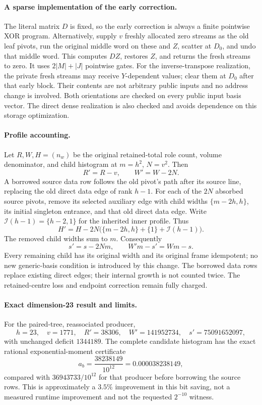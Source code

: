\paragraph{A sparse implementation of the early correction.}
The literal matrix $D$ is fixed, so the early correction is always a finite
pointwise XOR program. Alternatively, supply $v$ freshly allocated zero
streams as the old leaf pivots, run the original middle word on these and $Z$,
scatter at $D_0$, and undo that middle word. This computes $DZ$, restores $Z$,
and returns the fresh streams to zero. It uses $2|M|+|J|$ pointwise gates.
For the inverse-transpose realization, the private fresh streams may receive
$Y$-dependent values; clear them at $D_0$ after that early block. Their contents
are not arbitrary public inputs and no address change is involved. Both
orientations are checked on every public input basis vector. The direct dense
realization is also checked and avoids dependence on this storage optimization.

\paragraph{Profile accounting.}
Let $R,W,H=(n_w)$ be the original retained-total role count, volume denominator,
and child histogram at $m=h^2$, $N=v^2$. Then
\[
 R'=R-v,\qquad W'=W-2N.
\]
A borrowed source data row follows the old pivot's path after its source line,
replacing the old direct data edge of rank $h-1$. For each of the $2N$ absorbed
source pivots, remove its selected auxiliary edge with child widths
$\{m-2h,h\}$, its initial singleton entrance, and that old direct data edge.
Write $\mathcal I(h-1)=\{h-2,1\}$ for the inherited inner profile. Thus
\[
 H'=H-2N\bigl(\{m-2h,h\}+\{1\}+\mathcal I(h-1)\bigr).
\]
The removed child widths sum to $m$. Consequently
\[
 s'=s-2Nm,\qquad W'm-s'=Wm-s.
\]
Every remaining child has its original width and its original frame idempotent;
no new generic-basis condition is introduced by this change. The borrowed data
rows replace existing direct edges; their internal growth is not counted twice.
The retained-centre loss and endpoint correction remain fully charged.

\paragraph{Exact dimension-23 result and limits.}
For the paired-tree, reassociated producer,
\[
 h=23,\quad v=1771,\quad R'=38306,\quad
 W'=141952734,\quad s'=75091652097,
\]
with unchanged deficit $1344189$. The complete candidate histogram has the
exact rational exponential-moment certificate
\[
 a_b=\frac{38238149}{10^{12}}=0.000038238149,
\]
compared with $36943733/10^{12}$ for that producer before borrowing the source
rows. This is approximately a $3.5\%$ improvement in this bit saving, not a
measured runtime improvement and not the requested $2^{-10}$ witness.


